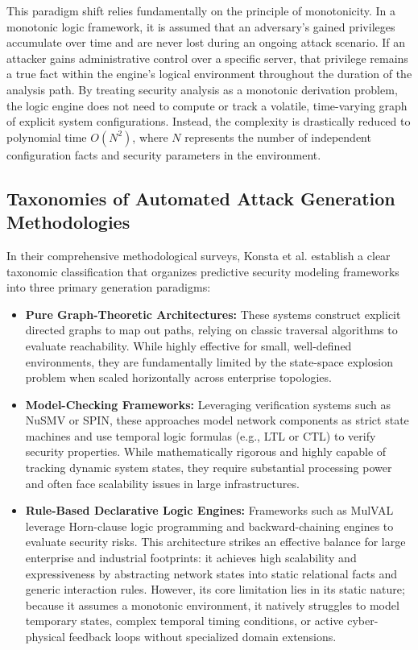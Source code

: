 \documentclass[target=mst,aauheader=aics,style=]{thud}
\begin{document}
This paradigm shift relies fundamentally on the principle of monotonicity. In a monotonic logic framework, it is assumed that an adversary's gained privileges accumulate over time and are never lost during an ongoing attack scenario. If an attacker gains administrative control over a specific server, that privilege remains a true fact within the engine's logical environment throughout the duration of the analysis path. By treating security analysis as a monotonic derivation problem, the logic engine does not need to compute or track a volatile, time-varying graph of explicit system configurations. Instead, the complexity is drastically reduced to polynomial time $O(N^2)$, where $N$ represents the number of independent configuration facts and security parameters in the environment.

\subsection{Taxonomies of Automated Attack Generation Methodologies}
In their comprehensive methodological surveys, Konsta et al. establish a clear taxonomic classification that organizes predictive security modeling frameworks into three primary generation paradigms:
\begin{itemize}
    \item \textbf{Pure Graph-Theoretic Architectures:} These systems construct explicit directed graphs to map out paths, relying on classic traversal algorithms to evaluate reachability. While highly effective for small, well-defined environments, they are fundamentally limited by the state-space explosion problem when scaled horizontally across enterprise topologies.
    \item \textbf{Model-Checking Frameworks:} Leveraging verification systems such as NuSMV or SPIN, these approaches model network components as strict state machines and use temporal logic formulas (e.g., LTL or CTL) to verify security properties. While mathematically rigorous and highly capable of tracking dynamic system states, they require substantial processing power and often face scalability issues in large infrastructures.
    \item \textbf{Rule-Based Declarative Logic Engines:} Frameworks such as MulVAL leverage Horn-clause logic programming and backward-chaining engines to evaluate security risks. This architecture strikes an effective balance for large enterprise and industrial footprints: it achieves high scalability and expressiveness by abstracting network states into static relational facts and generic interaction rules. However, its core limitation lies in its static nature; because it assumes a monotonic environment, it natively struggles to model temporary states, complex temporal timing conditions, or active cyber-physical feedback loops without specialized domain extensions.
\end{itemize}
\end{document}
